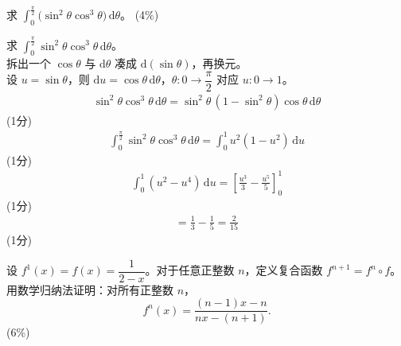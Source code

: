 \begin{question}[points = 4]
    求 $\displaystyle\int_0^{\frac{\pi}{2}}\bigl(\sin^2\theta\cos^3\theta\bigr)\,\mathrm{d}\theta$。
    \hfill (4\%)
\end{question}

\begin{solution}
    求 $\displaystyle\int_0^{\frac{\pi}{2}}\sin^2\theta\cos^3\theta\,\mathrm{d}\theta$。\\
    拆出一个 $\cos\theta$ 与 $\mathrm{d}\theta$ 凑成 $\mathrm{d}(\sin\theta)$，再换元。\\
    设 $u=\sin\theta$，则 $\mathrm{d}u=\cos\theta\,\mathrm{d}\theta$，$\theta:0\to\dfrac{\pi}{2}$ 对应 $u:0\to1$。\\
    \begin{align*}
        \sin^2\theta\cos^3\theta\,\mathrm{d}\theta=\sin^2\theta\,(1-\sin^2\theta)\cos\theta\,\mathrm{d}\theta
    \end{align*}
    \hfill (1分) \\
    \begin{align*}
        \int_0^{\frac{\pi}{2}}\sin^2\theta\cos^3\theta\,\mathrm{d}\theta=\int_0^1u^2(1-u^2)\,\mathrm{d}u
    \end{align*}
    \hfill (1分) \\
    \begin{align*}
        \int_0^1(u^2-u^4)\,\mathrm{d}u=\left[\frac{u^3}{3}-\frac{u^5}{5}\right]_0^1
    \end{align*}
    \hfill (1分) \\
    \begin{align*}
        =\frac13-\frac15=\frac{2}{15}
    \end{align*}
    \hfill (1分)
\end{solution}

\begin{question}[points = 6]
    设 $f^1(x)=f(x)=\dfrac{1}{2-x}$。对于任意正整数 $n$，定义复合函数 $f^{n+1}=f^n\circ f$。用数学归纳法证明：对所有正整数 $n$，
    \[
        f^n(x)=\frac{(n-1)x-n}{nx-(n+1)}.
    \]
    \hfill (6\%)
\end{question}

